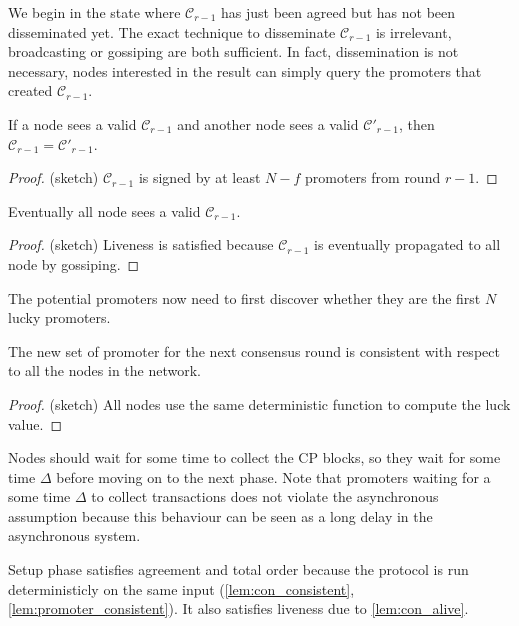 We begin in the state where $\mathcal{C}_{r-1}$ has just been agreed but has not
been disseminated yet. The exact technique to disseminate $\mathcal{C}_{r-1}$ is
irrelevant, broadcasting or gossiping are both sufficient. In fact,
dissemination is not necessary, nodes interested in the result can simply query
the promoters that created $\mathcal{C}_{r-1}$.

\begin{lemma}\label{lem:con_consistent}
  If a node sees a valid $\mathcal{C}_{r-1}$ and another node sees a valid
  $\mathcal{C}'_{r-1}$, then $\mathcal{C}_{r-1} = \mathcal{C}'_{r-1}$.
\end{lemma}
\begin{proof}
  (sketch) $\mathcal{C}_{r-1}$ is signed by at least $N-f$ promoters from round
  $r-1$.
\end{proof}

\begin{lemma}\label{lem:con_alive}
  Eventually all node sees a valid $\mathcal{C}_{r-1}.$  
\end{lemma}
\begin{proof}
  (sketch) Liveness is satisfied because $\mathcal{C}_{r-1}$ is eventually propagated to
  all node by gossiping.
\end{proof}

The potential promoters now need to first discover whether
they are the first $N$ lucky promoters.

\begin{lemma}\label{lem:promoter_consistent}
  The new set of promoter for the next consensus round is consistent with
  respect to all the nodes in the network.
\end{lemma}
\begin{proof}
  (sketch) All nodes use the same deterministic function to compute the luck
  value.
\end{proof}

Nodes should wait for some time to collect the CP blocks, so they wait for some
time $\Delta$ before moving on to the next phase. Note that promoters waiting
for a some time $\Delta$ to collect transactions does not violate the
asynchronous assumption because this behaviour can be seen as a long delay in
the asynchronous system.

\begin{corollary}
  Setup phase satisfies agreement and total order because the protocol is run
  deterministicly on the same input (\cref{lem:con_consistent},
  \cref{lem:promoter_consistent}). It also satisfies liveness due to
  \cref{lem:con_alive}.
\end{corollary}

